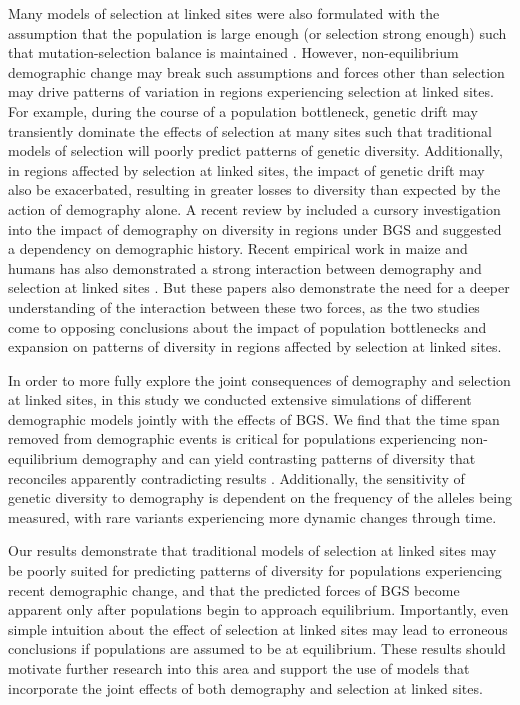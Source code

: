 \documentclass[9pt,twocolumn,twoside]{rilabRxiv}
\begin{document}
Many models of selection at linked sites were also formulated with the assumption that the population is large enough (or selection strong enough) such that mutation-selection balance is maintained \citep{charlesworth1993effect, zeng2013coalescent, nicolaisen2013distortions}.
However, non-equilibrium demographic change may break such assumptions and forces other than selection may drive patterns of variation in regions experiencing selection at linked sites.
For example, during the course of a population bottleneck, genetic drift may transiently dominate the effects of selection at many sites such that traditional models of selection will poorly predict patterns of genetic diversity.
Additionally, in regions affected by selection at linked sites, the impact of genetic drift may also be exacerbated, resulting in greater losses to diversity than expected by the action of demography alone.
A recent review by \citet{comeron2017background} included a cursory investigation into the impact of demography on diversity in regions under BGS and suggested a dependency on demographic history.
Recent empirical work in maize and humans has also demonstrated a strong interaction between demography and selection at linked sites \citep{beissinger2016recent,torres2018human}.
But these papers also demonstrate the need for a deeper understanding of the interaction between these two forces, as the two studies come to opposing conclusions about the impact of population bottlenecks and expansion on patterns of diversity in regions affected by selection at linked sites.

In order to more fully explore the joint consequences of demography and selection at linked sites, in this study we conducted extensive simulations of different demographic models jointly with the effects of BGS.
We find that the time span removed from demographic events is critical for populations experiencing non-equilibrium demography and can yield contrasting patterns of diversity that reconciles apparently contradicting results  \citep{beissinger2016recent,torres2018human}.
Additionally, the sensitivity of genetic diversity to demography is dependent on the frequency of the alleles being measured, with rare variants experiencing more dynamic changes through time.

Our results demonstrate that traditional models of selection at linked sites may be poorly suited for predicting patterns of diversity for populations experiencing recent demographic change, and that the predicted forces of BGS become apparent only after populations begin to approach equilibrium.
Importantly, even simple intuition about the effect of selection at linked sites may lead to erroneous conclusions if populations are assumed to be at equilibrium.
These results should motivate further research into this area and support the use of models that incorporate the joint effects of both demography and selection at linked sites.
\end{document}
